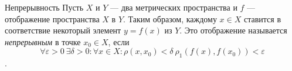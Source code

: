 \documentclass[]{article}
\begin{document}
Непрерывность
Пусть $X$ и $Y$ --- два метрических пространства и $f$ --- отображение пространства $X$ в $Y$. Таким образом, каждому $x \in X$ ставится в соответствие некоторый элемент $y=f(x)$ из $Y$. Это отображение называется \textit{непрерывным} в точке $x_0 \in X$, если 
$$\forall\varepsilon>0 \  \exists \delta>0: \forall x\in X: \rho(x,x_0)<\delta\ \rho_1(f(x),f(x_0))<\varepsilon$$.
\end{document}
